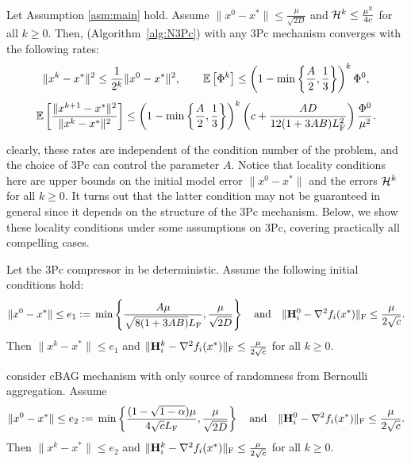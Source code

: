 \documentclass[11pt]{article}
\begin{document}
	\begin{theorem}\label{th:NLU}
		Let Assumption \ref{asm:main} hold. Assume $\|x^0-x^*\| \leq \frac{\mu}{\sqrt{2D}}$ and ${\cal H}^k \leq \frac{\mu^2}{4c}$ for all $k\geq 0$. Then,  (Algorithm~\ref{alg:N3Pc}) with any 3Pc mechanism converges with the following rates:
		\begin{equation}\label{rate:local-linear-iter}
			\squeeze
			\|x^k - x^*\|^2 \leq  \frac{1}{2^k}   \|x^0-x^*\|^2, \qquad \E\ll\Phi^k\rr \leq  \left(  1 - \min\left\{  \frac{A}{2}, \frac{1}{3}  \right\}  \right)^k\Phi^0,
		\end{equation}
		\begin{equation}\label{rate:local-superlinear-iter}
			\squeeze
			\E\ll\frac{\|x^{k+1}-x^*\|^2}{\|x^k-x^*\|^2}\rr \leq  \left(  1 - \min\left\{  \frac{A}{2}, \frac{1}{3}  \right\}  \right)^k \left(  c + \frac{AD}{12(1+3AB)\HF^2}  \right) \frac{\Phi^0}{\mu^2}. 
		\end{equation}    
	\end{theorem}
	
	clearly, these rates are independent of the condition number of the problem, and the choice of 3Pc can control the parameter $A$. Notice that locality conditions here are upper bounds on the initial model error $\|x^0-x^*\|$ and the errors ${\mathcal{H}}^k$ for all $k\ge0$. It turns out that the latter condition may not be guaranteed in general since it depends on the structure of the 3Pc mechanism. Below, we show these locality conditions under some assumptions on 3Pc, covering practically all compelling cases.
	
	\begin{lemma}[Deterministic 3Pc]\label{lm:boundforbiased}
		Let the 3Pc compressor in  be deterministic. Assume the following initial conditions hold: $$\|x^0 - x^*\| \le e_1 \; { := }\; \min\left\{ \frac{A\mu}{\sqrt{8(1+3AB)}L_{\rm F}}, \frac{\mu}{\sqrt{2D}}  \right\} \quad\text{and}\quad \|\mathbf{H}_i^0 - \nabla^2 f_i(x^*)\|_{\rm F} \leq \frac{\mu}{2\sqrt{c}}.$$
		Then $\|x^k-x^*\| \leq e_1$ and $\|\mathbf{H}_i^k - \nabla^2 f_i(x^*)\|_{\rm F}  \leq \frac{\mu}{2\sqrt{c}}$ for all $k\geq 0$. 
	\end{lemma}
	
	\begin{lemma}[cBAG]\label{lm:boundforcbag}
		consider cBAG mechanism with only source of randomness from Bernoulli aggregation. Assume $$\|x^0 - x^*\| \le e_2 \; { := }\; \min\left\{  \frac{(1-\sqrt{1-\alpha})\mu}{4\sqrt{c}L_{\rm F}}, \frac{\mu}{\sqrt{2D}}  \right\} \quad\text{and}\quad \|\mathbf{H}_i^0 - \nabla^2 f_i(x^*)\|_{\rm F} \leq \frac{\mu}{2\sqrt{c}}.$$
		Then $\|x^k-x^*\| \leq e_2$ and $\|\mathbf{H}_i^k - \nabla^2 f_i(x^*)\|_{\rm F}  \leq \frac{\mu}{2\sqrt{c}}$ for all $k\geq 0$. 
	\end{lemma}
	
\end{document}
